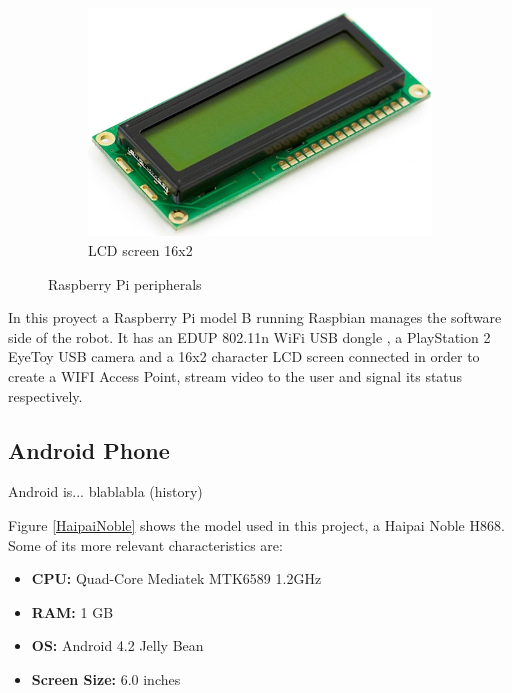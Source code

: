 \begin{figure}[H]
\begin{subfigure}[b]{0.3\textwidth}
		    \end{subfigure}
		    \hfill
		    \begin{subfigure}[b]{0.3\textwidth}
		        \centering
		      	\includegraphics[scale=0.25]{images/ProjectComponents/lcd.jpg}
				\caption{LCD screen 16x2}
		        \label{}
		    \end{subfigure}
		    \caption{Raspberry Pi peripherals}
		    \label{}
		\end{figure}


	In this proyect a Raspberry Pi model B running Raspbian manages the software side of the robot. It has an EDUP 802.11n WiFi USB dongle , a PlayStation 2 EyeToy USB camera and a 16x2 character LCD screen connected in order to create a WIFI Access Point, stream video to the user and signal its status respectively.






\newpage
\subsection{Android Phone}

Android is... blablabla  (history)


Figure \ref{HaipaiNoble} shows the model used in this project, a Haipai Noble H868. \\
Some of its more relevant characteristics are:

	\begin{itemize}
	\item \textbf{CPU:} Quad-Core Mediatek MTK6589 1.2GHz
	\item \textbf{RAM:} 1 GB
	\item \textbf{OS:} Android 4.2 Jelly Bean
	\item \textbf{Screen Size:} 6.0 inches
	\end{itemize}

